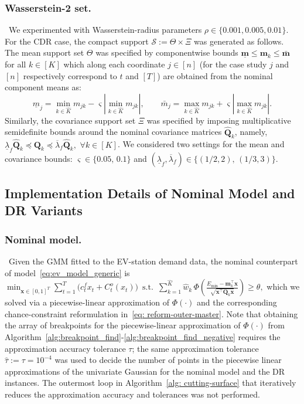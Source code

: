 \documentclass[opre,sglanonrev]{informs4}
\newcommand{\mS}{\mathcal{S}}
\newcommand{\bmean}{\bm{m}}
\newcommand{\bx}{\bm{x}}
\newcommand{\bQ}{\bm Q}
\begin{document}
{\subsubsection{Wasserstein-2 set. }\label{sec: mean-cov-spec}\, 
We experimented with Wasserstein-radius parameters \(\rho \in \{0.001,0.005,0.01\}\). For the CDR case, the compact support $\mS:=\Theta\times\Xi$ was generated as follows. The mean support set \(\Theta\) was specified by componentwise bounds \(\underline{\bmean} \le \bmean_k \le \bar{\bmean}\) for all \(k \in [K]\) which along each coordinate \(j \in [n]\) (for the case study $j$ and $[n]$ respectively correspond to $t$ and $[T]$) are obtained from the nominal component means as:\vspace{-1.5em}
\[
\underline{m}_j
=
\min_{k \in \hat K} m_{jk}
-
\varsigma\left|\min_{k \in \hat K} m_{jk}\right|,
\qquad
\bar{m}_j
=
\max_{k \in \hat K} m_{jk}
+
\varsigma\left|\max_{k \in \hat K} m_{jk}\right|.
\]
Similarly, the covariance support set \(\Xi\) was specified by imposing multiplicative semidefinite bounds around the nominal covariance matrices \(\hat{\bQ}_k\), namely, $\underline{\lambda}_f \hat{\bQ}_k \preceq \bQ_k \preceq \overline{\lambda}_f \hat{\bQ}_k,
\,\, \forall k\in[K]$. We considered two settings for the mean and covariance bounds: \(\varsigma \in \{0.05,\,0.1\}\) and \((\underline{\lambda}_f,\overline{\lambda}_f)\in \{(1/2,2),\,(1/3,3)\}\).
 
\subsection{Implementation Details of Nominal Model and DR Variants}
\label{sec: implementation}

\subsubsection{Nominal model. }\,
Given the GMM fitted to the EV-station demand data, the nominal counterpart of model~\eqref{eq:ev_model_generic} is $\min_{\bx\in[0,1]^T}\sum_{t=1}^T\bigl(c_t^f x_t + C_t^o(x_t)\bigr)
\,\,\, \mathrm{s.t.} \,\,\,
\sum_{k=1}^{\hat K} \hat w_k \,
\Phi\!\left(\frac{E_{\min}-\bmean_k^\top \bx}{\sqrt{\bx^\top \bQ_k \bx}}\right)\ge \theta,$ which we solved via a piecewise-linear approximation of \(\Phi(\cdot)\) and the corresponding chance-constraint reformulation in~\eqref{eq: reform-outer-master}. Note that obtaining the array of breakpoints for the piecewise-linear approximation of $\Phi(\cdot)$ from Algorithm~\ref{alg:breakpoint_find}-\ref{alg:breakpoint_find_negative} requires the approximation accuracy tolerance $\tau$; the same approximation tolerance $\hat{\tau}:=\tau = 10^{-4}$ was used to decide the number of points in the piecewise linear approximations of the univariate Gaussian for the nominal model and the DR instances. The outermost loop in Algorithm~\ref{alg: cutting-surface} that iteratively reduces the approximation accuracy and tolerances was not performed.


}
\end{document}
